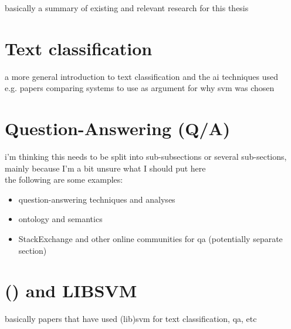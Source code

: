 \label{chap:chapter2}
basically a summary of existing and relevant research for this thesis

\section{Text classification}
\label{sec:text_classification}
a more general introduction to text classification and the \gls{ai} techniques used \\
e.g. papers comparing systems to use as argument for why svm was chosen

\section{Question-Answering (Q/A)}
\label{sec:question_answering}
i'm thinking this needs to be split into sub-subsections or several sub-sections, mainly because I'm a bit unsure what I should put here \\
the following are some examples: 
\begin{itemize}
	\item question-answering techniques and analyses
	\item ontology and semantics
	\item StackExchange and other online communities for qa (potentially separate section)
\end{itemize}

\section{ () and LIBSVM}
\label{sec:libsvm}
basically papers that have used (lib)svm for text classification, qa, etc

